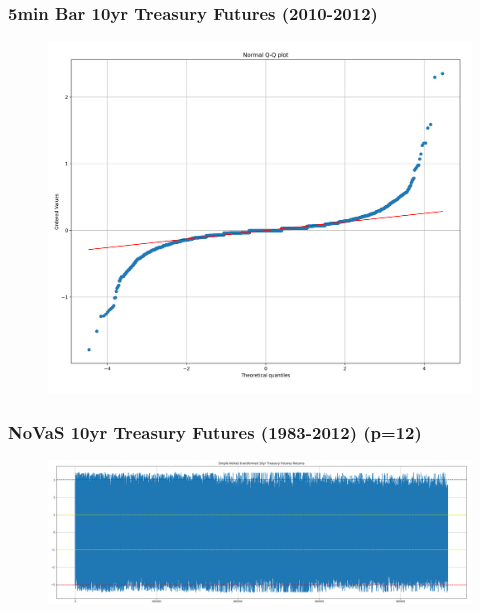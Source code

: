 \documentclass{beamer}
\begin{document}
\begin{frame}
\frametitle{5min Bar 10yr Treasury Futures (2010-2012)}
\begin{figure}[h!]
\includegraphics[width=\textwidth]{ty_returns_2010_qqplot.png}
\end{figure}
\end{frame}

\begin{frame}
\frametitle{NoVaS 10yr Treasury Futures (1983-2012) (p=12)}
\begin{figure}[h!]
\includegraphics[width=\textwidth]{novas_ty_returns.png}
\end{figure}
\end{frame}
\end{document}
